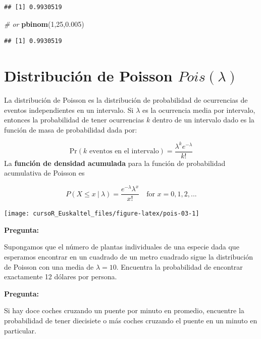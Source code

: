 \documentclass[]{book}
\newenvironment{Shaded}{\begin{snugshade}}{\end{snugshade}}
\newcommand{\KeywordTok}[1]{\textcolor[rgb]{0.13,0.29,0.53}{\textbf{#1}}}
\newcommand{\DecValTok}[1]{\textcolor[rgb]{0.00,0.00,0.81}{#1}}
\newcommand{\FloatTok}[1]{\textcolor[rgb]{0.00,0.00,0.81}{#1}}
\newcommand{\CommentTok}[1]{\textcolor[rgb]{0.56,0.35,0.01}{\textit{#1}}}
\newcommand{\NormalTok}[1]{#1}
\begin{document}
\begin{verbatim}
## [1] 0.9930519
\end{verbatim}

\begin{Shaded}
\begin{Highlighting}[]
\CommentTok{# or}
\KeywordTok{pbinom}\NormalTok{(}\DecValTok{1}\NormalTok{,}\DecValTok{25}\NormalTok{,}\FloatTok{0.005}\NormalTok{)}
\end{Highlighting}
\end{Shaded}

\begin{verbatim}
## [1] 0.9930519
\end{verbatim}

\section{\texorpdfstring{Distribución de Poisson
\(Pois(\lambda)\)}{Distribución de Poisson Pois(\textbackslash{}lambda)}}\label{distribucion-de-poisson-poislambda}

La distribución de Poisson es la distribución de probabilidad de
ocurrencias de eventos independientes en un intervalo. Si \(\lambda\) es
la ocurrencia media por intervalo, entonces la probabilidad de tener
ocurrencias \(k\) dentro de un intervalo dado es la función de masa de
probabilidad dada por:

\[
\mbox{Pr}(\mbox{$k$ eventos en el intervalo}) = \frac{\lambda^k e^{-\lambda}}{k!}
\] La \textbf{función de densidad acumulada} para la función de
probabilidad acumulativa de Poisson es

\[
P(X\leq x ~|~\lambda ) = \frac{e^{-\lambda} \lambda ^x}{x!}\quad \mbox{for $x=0,1,2,...$}
\]

\begin{center}\texttt{[image: cursoR\_Euskaltel\_files/figure-latex/pois-03-1]} \end{center}

\textbf{Pregunta:}

Supongamos que el número de plantas individuales de una especie dada que
esperamos encontrar en un cuadrado de un metro cuadrado sigue la
distribución de Poisson con una media de \(\lambda= 10\). Encuentra la
probabilidad de encontrar exactamente 12 dólares por persona.

\textbf{Pregunta:}

Si hay doce coches cruzando un puente por minuto en promedio, encuentre
la probabilidad de tener diecisiete o más coches cruzando el puente en
un minuto en particular.
\end{document}
